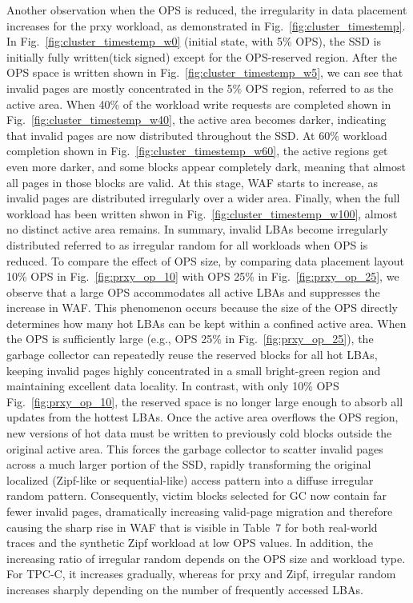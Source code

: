 \documentclass{ieeeaccess}
\begin{document}
Another observation when the OPS is reduced, the irregularity in data placement increases for the prxy workload, as demonstrated in Fig.~\ref{fig:cluster_timestemp}. In Fig.~\ref{fig:cluster_timestemp_w0} (initial state, with 5\% OPS), the SSD is initially fully written(tick signed) except for the OPS-reserved region. After the OPS space is written shown in Fig.~\ref{fig:cluster_timestemp_w5}, we can see that invalid pages are mostly concentrated in the 5\% OPS region, referred to as the active area.
When 40\% of the workload write requests are completed shown in Fig.~\ref{fig:cluster_timestemp_w40}, the active area becomes darker, indicating that invalid pages are now distributed throughout the SSD. At 60\% workload completion shown in Fig.~\ref{fig:cluster_timestemp_w60}, the active regions get even more darker, and some blocks appear completely dark, meaning that almost all pages in those blocks are valid. At this stage, WAF starts to increase, as invalid pages are distributed irregularly over a wider area. Finally, when the full workload has been written shwon in Fig.~\ref{fig:cluster_timestemp_w100}, almost no distinct active area remains. In summary, invalid LBAs become irregularly distributed referred to as irregular random for all workloads when OPS is reduced. To compare the effect of OPS size, by comparing data placement layout 10\% OPS in Fig.~\ref{fig:prxy_op_10} with OPS 25\% in Fig.~\ref{fig:prxy_op_25}, we observe that a large OPS accommodates all active LBAs and suppresses the increase in WAF. This phenomenon occurs because the size of the OPS directly determines how many hot LBAs can be kept within a confined active area. 
When the OPS is sufficiently large (e.g., OPS 25\% in Fig.~\ref{fig:prxy_op_25}), the garbage collector can repeatedly reuse the reserved blocks for all hot LBAs, keeping invalid pages highly concentrated in a small bright-green region and maintaining excellent data locality. In contrast, with only 10\% OPS Fig.~\ref{fig:prxy_op_10}, the reserved space is no longer large enough to absorb all updates from the hottest LBAs. Once the active area overflows the OPS region, new versions of hot data must be written to previously cold blocks outside the original active area. 
This forces the garbage collector to scatter invalid pages across a much larger portion of the SSD, rapidly transforming the original localized (Zipf-like or sequential-like) access pattern into a diffuse irregular random pattern. 
Consequently, victim blocks selected for GC now contain far fewer invalid pages, dramatically increasing valid-page migration and therefore causing the sharp rise in WAF that is visible in Table~7 for both real-world traces and the synthetic Zipf workload at low OPS values. In addition, the increasing ratio of irregular random depends on the OPS size and workload type. For TPC-C, it increases gradually, whereas for prxy and Zipf, irregular random increases sharply depending on the number of frequently accessed LBAs.
\end{document}
